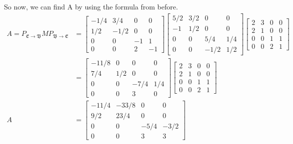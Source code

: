 \documentclass{report}
\begin{document}
So now, we can find A by using the formula from before.
$$
\begin{aligned}
A = P_{\mathfrak{E}\rightarrow\mathfrak{B}}MP_{\mathfrak{B}\rightarrow\mathfrak{E}} & = 
\begin{bmatrix}
-1/4 & 3/4 & 0 & 0 \\
1/2 & -1/2 & 0 & 0 \\
0 & 0 & -1 & 1 \\
0 & 0 & 2 & -1
\end{bmatrix}
\begin{bmatrix}
5 / 2 & 3 / 2 & 0 & 0 \\
-1 & 1 / 2 & 0 & 0 \\
0 & 0 & 5 / 4 & 1 / 4 \\
0 & 0 & -1 / 2 & 1 / 2
\end{bmatrix}
\begin{bmatrix}
2 & 3 & 0 & 0 \\
2 & 1 & 0 & 0 \\
0 & 0 & 1 & 1 \\
0 & 0 & 2 & 1
\end{bmatrix} \\
& =
\begin{bmatrix}
-11/8 & 0 & 0 & 0 \\
7/4 & 1/2 & 0 & 0 \\
0 & 0 & -7/4 & 1/4 \\
0 & 0 & 3 & 0
\end{bmatrix}
\begin{bmatrix}
2 & 3 & 0 & 0 \\
2 & 1 & 0 & 0 \\
0 & 0 & 1 & 1 \\
0 & 0 & 2 & 1
\end{bmatrix} \\
A & =
\begin{bmatrix}
-11/4 & -33/8 & 0 & 0 \\
9/2 & 23/4 & 0 & 0 \\
0 & 0 & -5/4 & -3/2 \\
0 & 0 & 3 & 3
\end{bmatrix}
\end{aligned}
$$
\end{document}
